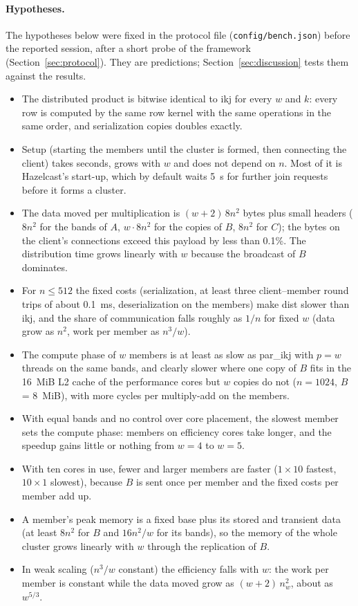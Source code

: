 \documentclass[11pt,a4paper]{article}
\begin{document}
\paragraph{Hypotheses.} The hypotheses below were fixed in the protocol file
(\texttt{config/bench.json}) before the reported session, after a short probe
of the framework (Section~\ref{sec:protocol}). They are predictions;
Section~\ref{sec:discussion} tests them against the results.
\begin{itemize}
  \item[H1] The distributed product is bitwise identical to ikj for every $w$
  and $k$: every row is computed by the same row kernel with the same operations
  in the same order, and serialization copies doubles exactly.
  \item[H2] Setup (starting the members until the cluster is formed, then
  connecting the client) takes seconds, grows with $w$ and does not depend on
  $n$. Most of it is Hazelcast's start-up, which by default waits 5~s for
  further join requests before it forms a cluster.
  \item[H3] The data moved per multiplication is $(w+2)\,8n^2$ bytes plus small
  headers ($8n^2$ for the bands of $A$, $w\cdot8n^2$ for the copies of $B$, $8n^2$
  for $C$); the bytes on the client's connections exceed this payload by less
  than 0.1\%. The distribution time grows linearly with $w$ because the
  broadcast of $B$ dominates.
  \item[H4] For $n\le512$ the fixed costs (serialization, at least three
  client--member round trips of about 0.1~ms, deserialization on the members)
  make dist slower than ikj, and the share of communication falls roughly as
  $1/n$ for fixed $w$ (data grow as $n^2$, work per member as $n^3/w$).
  \item[H5] The compute phase of $w$ members is at least as slow as par\_ikj with
  $p=w$ threads on the same bands, and clearly slower where one copy of $B$ fits
  in the 16~MiB L2 cache of the performance cores but $w$ copies do not
  ($n=1024$, $B$ = 8~MiB), with more cycles per multiply-add on the members.
  \item[H6] With equal bands and no control over core placement, the slowest
  member sets the compute phase: members on efficiency cores take longer, and
  the speedup gains little or nothing from $w=4$ to $w=5$.
  \item[H7] With ten cores in use, fewer and larger members are faster
  ($1\times10$ fastest, $10\times1$ slowest), because $B$ is sent once per member
  and the fixed costs per member add up.
  \item[H8] A member's peak memory is a fixed base plus its stored and
  transient data (at least $8n^2$ for $B$ and $16n^2/w$ for its bands), so the
  memory of the whole cluster grows linearly with $w$ through the replication of
  $B$.
  \item[H9] In weak scaling ($n^3/w$ constant) the efficiency falls with $w$:
  the work per member is constant while the data moved grow as $(w+2)\,n_w^2$,
  about as $w^{5/3}$.
\end{itemize}
\end{document}
